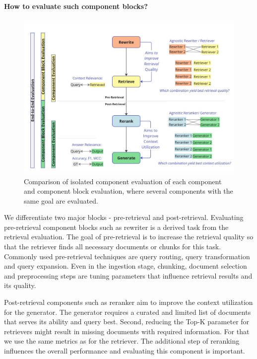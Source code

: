\paragraph{How to evaluate such component blocks?}

\begin{figure}
  \centering
  \includegraphics[width=\textwidth]{images/ComponentBlockEvaluation.pdf}
  \caption{Comparison of isolated component evaluation of each component and component block evaluation, where several components with the same goal are evaluated.}
  \label{fig:componentblockeval}
\end{figure}


We differentiate two major blocks - pre-retrieval and post-retrieval. Evaluating pre-retrieval component blocks such as rewriter is a derived task from the retrieval evaluation. The goal of pre-retrieval is to increase the retrieval quality so that the retriever finds all necessary documents or chunks for this task. Commonly used pre-retrieval techniques are query routing, query transformation and query expansion. Even in the ingestion stage, chunking, document selection and preprocessing steps are tuning parameters that influence retrieval results and its quality. 

Post-retrieval components such as reranker aim to improve the context utilization for the generator. The generator requires a curated and limited list of documents that serves its ability and query best. Second, reducing the Top-K parameter for retrievers might result in missing documents with required information. For that we use the same metrics as for the retriever. The additional step of reranking influences the overall performance and evaluating this component is important. 

